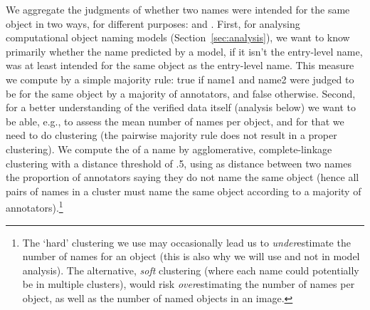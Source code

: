 We aggregate the judgments of whether two names were intended for the same object in two ways, for different purposes: \sameobject and \cluster.
First, for analysing computational object naming models (Section~\ref{sec:analysis}), 
we want to know primarily whether the name predicted by a model, if it isn't the entry-level name, was at least intended for the same object as the entry-level name.
This \textbf{\sameobject} measure we compute by a simple majority rule: true if name1 and name2 were judged to be for the same object by a majority of annotators, and false otherwise.
Second, for a better understanding of the verified \mn data itself (analysis below) we want to be able, e.g., to assess the mean number of names per object, and for that we need to do clustering (the pairwise majority rule does not result in a proper clustering). 
We compute the \textbf{\cluster} of a name by agglomerative, complete-linkage clustering with a distance threshold of .5, using as distance between two names the proportion of annotators saying they do not name the same object (hence all pairs of names in a cluster must name the same object according to a majority of annotators).\footnote{
	The `hard' clustering we use may occasionally lead us to \emph{under}estimate the number of names for an object (this is also why we will use \sameobject and not \cluster in model analysis). The alternative, \emph{soft} clustering (where each name could potentially be in multiple clusters), would risk \emph{over}estimating the number of names per object, as well as the number of named objects in an image.
}





